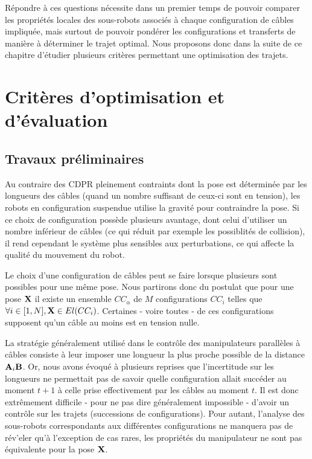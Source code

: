 R\'epondre \`a ces questions n\'ecessite dans un premier temps de 
pouvoir comparer les propri\'et\'es locales des sous-robots associ\'es \`a 
chaque configuration de c\^ables impliqu\'ee, mais surtout de pouvoir 
pond\'erer les configurations et transferts de mani\`ere \`a d\'eterminer le 
trajet optimal. Nous proposons donc dans la suite de ce chapitre d'\'etudier 
plusieurs crit\`eres permettant une optimisation des trajets.

\section{Crit\`eres d'optimisation et d'\'evaluation}

\subsection{Travaux pr\'eliminaires}

Au contraire des CDPR pleinement contraints dont la pose est d\'etermin\'ee par 
les longueurs des c\^ables (quand un nombre suffisant de ceux-ci sont en 
tension), les robots en configuration suspendue utilise la gravit\'e pour 
contraindre la pose. Si ce choix de configuration poss\`ede plusieurs avantage, 
dont celui d'utiliser un nombre inf\'erieur de c\^ables (ce qui r\'eduit par 
exemple les possiblit\'es de collision), il rend cependant le syst\`eme plus 
sensibles aux perturbations, ce qui affecte la qualit\'e du mouvement du robot.

Le choix d'une configuration de c\^ables peut se faire lorsque plusieurs sont 
possibles pour une m\^eme pose. Nous partirons donc du postulat que pour une 
pose ${\bf X}$ il existe un ensemble $CC_\alpha$ de $M$ configurations $CC_{i}$ 
telles que $\forall i \in [1, N], {\bf X} \in El(CC_i)$. Certaines - voire 
toutes - de ces configurations supposent qu'un c\^able au moins est en 
tension nulle.

La strat\'egie g\'en\'eralement utilis\'e dans le contr\^ole des manipulateurs 
parall\`eles \`a c\^ables consiste \`a leur imposer une longueur la plus proche 
possible de la distance ${\bf A}_i{\bf B}$. Or, nous avons \'evoqu\'e \`a 
plusieurs reprises que l'incertitude sur les longueurs ne permettait pas de 
savoir quelle configuration allait succ\'eder au moment $t+1$ \`a celle prise 
effectivement par les c\^ables au moment $t$. Il est donc extr\^emement 
difficile - pour ne pas dire g\'en\'eralement impossible - d'avoir un 
contr\^ole sur les trajets (successions de configurations). Pour autant, 
l'analyse des sous-robots correspondants aux diff\'erentes configurations ne 
manquera pas de r\'ev'eler qu'\`a l'exception de cas rares, les propri\'et\'es 
du manipulateur ne sont pas \'equivalente pour la pose ${\bf X}$.

